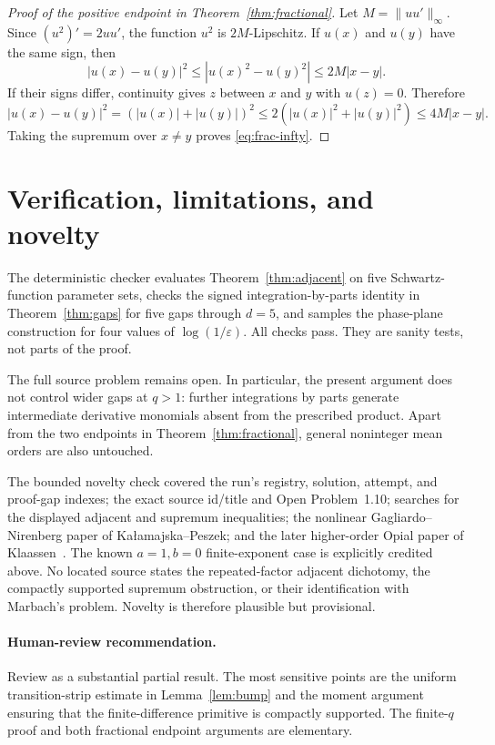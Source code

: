 \documentclass[11pt]{article}
\begin{document}
\begin{proof}[Proof of the positive endpoint in Theorem~\ref{thm:fractional}]
Let $M=\|uu'\|_\infty$.  Since $(u^2)'=2uu'$, the function $u^2$ is
$2M$-Lipschitz.  If $u(x)$ and $u(y)$ have the same sign, then
\[
 |u(x)-u(y)|^2
 \le |u(x)^2-u(y)^2|\le2M|x-y|.
\]
If their signs differ, continuity gives $z$ between $x$ and $y$ with
$u(z)=0$.  Therefore
\[
 |u(x)-u(y)|^2=(|u(x)|+|u(y)|)^2
 \le2(|u(x)|^2+|u(y)|^2)
 \le4M|x-y|.
\]
Taking the supremum over $x\ne y$ proves \eqref{eq:frac-infty}.
\end{proof}

\section{Verification, limitations, and novelty}

The deterministic checker evaluates Theorem~\ref{thm:adjacent} on five
Schwartz-function parameter sets, checks the signed integration-by-parts
identity in Theorem~\ref{thm:gaps} for five gaps through $d=5$, and samples
the phase-plane construction for four values of
$\log(1/\varepsilon)$.  All checks pass.  They are sanity tests, not parts of
the proof.

The full source problem remains open.  In particular, the present argument
does not control wider gaps at $q>1$: further integrations by parts generate
intermediate derivative monomials absent from the prescribed product.  Apart
from the two endpoints in Theorem~\ref{thm:fractional}, general noninteger
mean orders are also untouched.

The bounded novelty check covered the run's registry, solution, attempt, and
proof-gap indexes; the exact source id/title and Open Problem~1.10; searches
for the displayed adjacent and supremum inequalities; the nonlinear
Gagliardo--Nirenberg paper of Ka{\l}amajska--Peszek; and the later
higher-order Opial paper of Klaassen~\cite{Klaassen}.  The known
$a=1,b=0$ finite-exponent case is explicitly credited above.  No located
source states the repeated-factor adjacent dichotomy, the compactly supported
supremum obstruction, or their identification with Marbach's problem.
Novelty is therefore plausible but provisional.

\paragraph{Human-review recommendation.}
Review as a substantial partial result.  The most sensitive points are the
uniform transition-strip estimate in Lemma~\ref{lem:bump} and the moment
argument ensuring that the finite-difference primitive is compactly
supported.  The finite-$q$ proof and both fractional endpoint arguments are
elementary.
\end{document}
